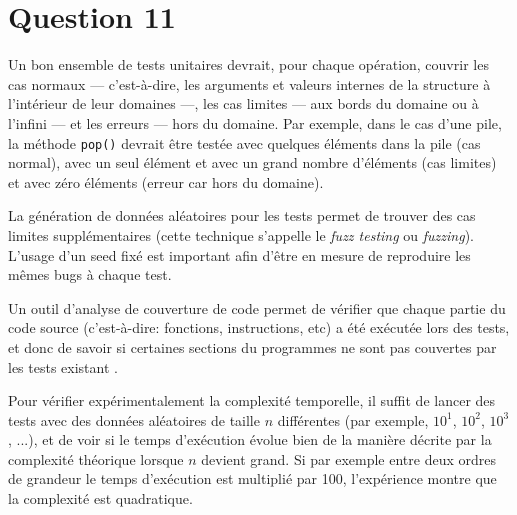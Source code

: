 \documentclass[a4paper,10pt]{article}
\begin{document}
\section*{Question 11}

Un bon ensemble de tests unitaires devrait, pour chaque opération, couvrir les cas normaux --- c'est-à-dire, les arguments et valeurs internes de la structure à l'intérieur de leur domaines ---, les cas limites --- aux bords du domaine ou à l'infini --- et les erreurs --- hors du domaine. Par exemple, dans le cas d'une pile, la méthode \texttt{pop()} devrait être testée avec quelques éléments dans la pile (cas normal), avec un seul élément et avec un grand nombre d'éléments (cas limites) et avec zéro éléments (erreur car hors du domaine)\cite{gooddstests}.

La génération de données aléatoires pour les tests permet de trouver des cas limites supplémentaires (cette technique s'appelle le \emph{fuzz testing} ou \emph{fuzzing})\cite{fuzztesting}. L'usage d'un seed fixé est important afin d'être en mesure de reproduire les mêmes bugs à chaque test.

Un outil d'analyse de couverture de code permet de vérifier que chaque partie du code source (c'est-à-dire: fonctions, instructions, etc) a été exécutée lors des tests, et donc de savoir si certaines sections du programmes ne sont pas couvertes par les tests existant \cite{codecoverage}.

Pour vérifier expérimentalement la complexité temporelle, il suffit de lancer des tests avec des données aléatoires de taille $n$ différentes (par exemple, $10^1$, $10^2$, $10^3$, ...), et de voir si le temps d'exécution évolue bien de la manière décrite par la complexité théorique lorsque $n$ devient grand. Si par exemple entre deux ordres de grandeur le temps d'exécution est multiplié par 100, l'expérience montre que la complexité est quadratique.

\printbibliography
\end{document}
